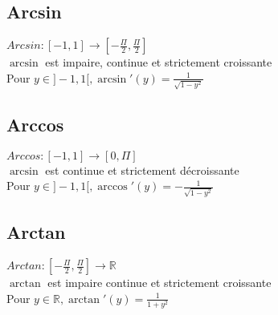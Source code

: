 \documentclass[fleqn]{article}
\theoremstyle{definition} \newtheorem*{defi}{D\'efinition}
\theoremstyle{definition} \newtheorem*{theo}{Th\'eor\`eme}
\begin{document}
\subsection{Arcsin}
\(Arcsin: [-1,1] \rightarrow [-\frac{\Pi}{2}, \frac{\Pi}{2}]\) \\
\(\arcsin\) est impaire, continue et strictement croissante \\
Pour \(y \in ]-1,1[, \arcsin'(y) = \frac{1}{\sqrt{1-y^2}}\) \\

\subsection{Arccos}
\(Arccos: [-1,1] \rightarrow [0, \Pi]\) \\
\(\arcsin\) est continue et strictement d\'{e}croissante \\
Pour \(y \in ]-1,1[, \arccos'(y) = -\frac{1}{\sqrt{1-y^2}}\) \\

\subsection{Arctan}
\(Arctan: [-\frac{\Pi}{2},\frac{\Pi}{2}] \rightarrow \mathbb{R}\) \\
\(\arctan\) est impaire continue et strictement croissante \\
Pour \(y \in \mathbb{R}, \arctan'(y) = \frac{1}{1+y^2}\) \\
\end{document}

